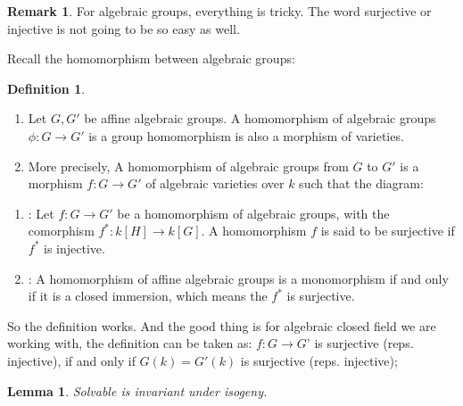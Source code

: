 \documentclass[12pt,a4paper,english]{article}
\theoremstyle{plain}
\newtheorem{lem}[thm]{Lemma}
\theoremstyle{definition}
\newtheorem{defi}[thm]{Definition}
\newtheorem*{rem}{Remark}
\begin{document}
\begin{rem}
For algebraic groups, everything is tricky. The word surjective or injective is not going to be so easy as well.

Recall the homomorphism between algebraic groups:
\begin{defi}
\begin{enumerate}
    \item Let $G, G'$ be affine algebraic groups. A homomorphism of algebraic groups $\phi: G\rightarrow G'$ is a group homomorphism is also a morphism of varieties.
    \item More precisely, A homomorphism of algebraic groups from $G$ to $G'$ is a morphism $f: G\rightarrow G'$ of algebraic varieties over $k$ such that the diagram:
    \begin{center}
    \end{center}
\end{enumerate}
\end{defi}

\begin{enumerate}
    \item[Onto]: Let $f: G\rightarrow G'$ be a homomorphism of algebraic groups, with the comorphism $f^{*}:k[H]\rightarrow k[G]$. A homomorphism $f$ is said to be surjective if $f^{*}$ is injective.
    \item[1-1]:  A homomorphism of affine algebraic groups is a monomorphism if and only if it is a closed immersion, which means  the $f^{*}$ is surjective.
\end{enumerate}

So the definition works. And the good thing is for algebraic closed field we are working with, the definition can be taken as: 
$f: G\rightarrow G’$ is surjective (reps. injective), if and only if $G(k)=G'(k)$ is surjective (reps. injective);

\end{rem}
\begin{lem}\label{lemonto}
Solvable is invariant under isogeny.
\end{lem}
\end{document}
